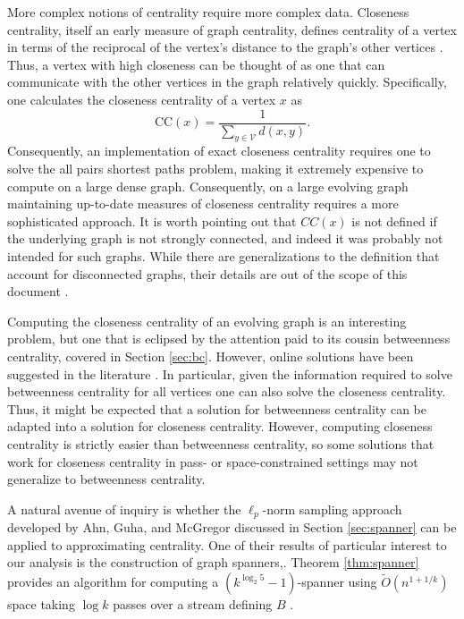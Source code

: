 \documentclass{report}
\begin{document}
More complex notions of centrality require more complex data. 
Closeness centrality, itself an early measure of graph centrality, defines centrality of a vertex in terms of the reciprocal of the vertex's distance to the graph's other vertices \cite{boldi2014axioms}. 
Thus, a vertex with high closeness can be thought of as one that can communicate with the other vertices in the graph relatively quickly. 
Specifically, one calculates the closeness centrality of a vertex $x$ as
%
\begin{equation} \label{eq:cc}
\textrm{CC}(x) = \frac{1}{\sum\limits_{y \in \mathcal{V}} d(x,y)}.
\end{equation}
%
Consequently, an implementation of exact closeness centrality requires one to solve the all pairs shortest paths problem, making it extremely expensive to compute on a large dense graph.
Consequently, on a large evolving graph maintaining up-to-date measures of closeness centrality requires a more sophisticated approach. 
It is worth pointing out that $CC(x)$ is not defined if the underlying graph is not strongly connected, and indeed it was probably not intended for such graphs. 
While there are generalizations to the definition that account for disconnected graphs, their details are out of the scope of this document \cite{boldi2014axioms}.

Computing the closeness centrality of an evolving graph is an interesting problem, but one that is eclipsed by the attention paid to its cousin betweenness centrality, covered in Section \ref{sec:bc}.
However, online solutions have been suggested in the literature \cite{wei2014real}. 
In particular, given the information required to solve betweenness centrality for all vertices one can also solve the closeness centrality.
Thus, it might be expected that a solution for betweenness centrality can be adapted into a solution for closeness centrality. 
However, computing closeness centrality is strictly easier than betweenness centrality, so some solutions that work for closeness centrality in pass- or space-constrained settings may not generalize to betweenness centrality.




A natural avenue of inquiry is whether the $\ell_p$-norm sampling approach developed by Ahn, Guha, and McGregor discussed in Section \ref{sec:spanner} can be applied to approximating centrality. 
One of their results of particular interest to our analysis is the construction of graph spanners,.
Theorem \ref{thm:spanner} provides an algorithm for computing a $(k^{\log_2 5} -1)$-spanner using $\widetilde{O}(n^{1+1/k})$ space taking $\log k$ passes over a stream defining $B$ \cite{ahn2012graph}. 
\end{document}
